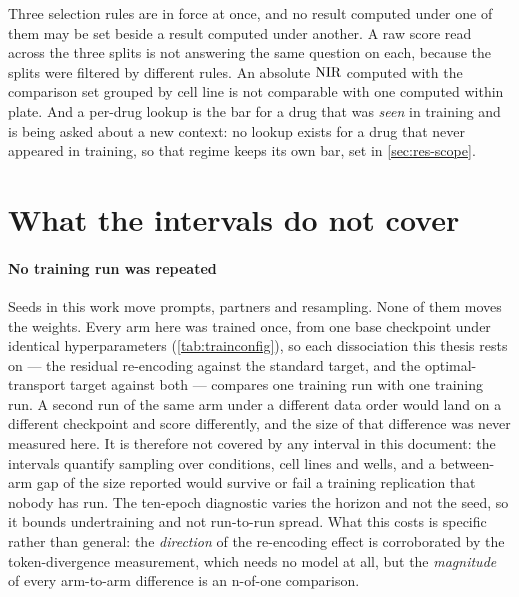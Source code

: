 %
\begin{scopelimit}
Three selection rules are in force at once, and no result computed under one of
them may be set beside a result computed under another. A raw score read across
the three splits is not answering the same question on each, because the splits
were filtered by different rules. An absolute $\textrm{NIR}$ computed with the
comparison set grouped by cell line is not comparable with one computed within
plate. And a per-drug lookup is the bar for a drug that was \emph{seen} in
training and is being asked about a new context: no lookup exists for a drug
that never appeared in training, so that regime keeps its own bar, set in
\cref{sec:res-scope}.
\end{scopelimit}

\section{What the intervals do not cover}
\label{sec:lim-intervals}

\paragraph{No training run was repeated} Seeds in this work move prompts,
partners and resampling. None of them moves the weights. Every arm here was
trained once, from one base checkpoint under identical hyperparameters
(\cref{tab:trainconfig}), so each dissociation this thesis rests on --- the
residual re-encoding against the standard target, and the optimal-transport
target against both --- compares one training run with one training run. A
second run of the same arm under a different data order would land on a
different checkpoint and score differently, and the size of that difference was
never measured here. It is therefore not covered by any interval in this
document: the intervals quantify sampling over conditions, cell lines and wells,
and a between-arm gap of the size reported would survive or fail a training
replication that nobody has run. The ten-epoch diagnostic varies the horizon and
not the seed, so it bounds undertraining and not run-to-run spread. What this
costs is specific rather than general: the \emph{direction} of the re-encoding
effect is corroborated by the token-divergence measurement, which needs no
model at all, but the \emph{magnitude} of every arm-to-arm difference is an
n-of-one comparison.

